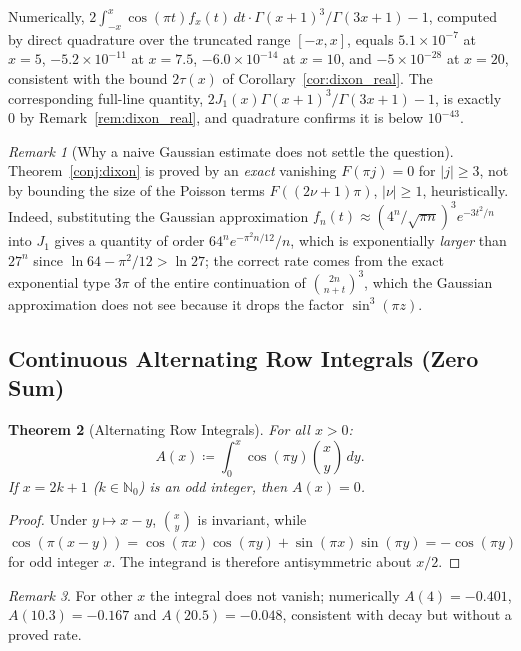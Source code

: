 \documentclass[11pt,a4paper]{article}
\theoremstyle{plain}
\newtheorem{theorem}{Theorem}[section]
\theoremstyle{definition}
\theoremstyle{remark}
\newtheorem{remark}[theorem]{Remark}
\numberwithin{equation}{section}
\begin{document}
Numerically, $2\int_{-x}^{x}\cos(\pi t)f_x(t)\,dt\cdot\Gamma(x+1)^3/\Gamma(3x+1) - 1$, computed by direct quadrature over the truncated range $[-x,x]$, equals $5.1\times10^{-7}$ at $x=5$, $-5.2\times10^{-11}$ at $x=7.5$, $-6.0\times10^{-14}$ at $x=10$, and $-5\times10^{-28}$ at $x=20$, consistent with the bound $2\tau(x)$ of Corollary~\ref{cor:dixon_real}. The corresponding full-line quantity, $2J_1(x)\Gamma(x+1)^3/\Gamma(3x+1) - 1$, is exactly $0$ by Remark~\ref{rem:dixon_real}, and quadrature confirms it is below $10^{-43}$.

\begin{remark}[Why a naive Gaussian estimate does not settle the question]
Theorem~\ref{conj:dixon} is proved by an \emph{exact} vanishing $F(\pi j)=0$ for $|j|\ge3$, not by bounding the size of the Poisson terms $F((2\nu+1)\pi)$, $|\nu|\ge1$, heuristically. Indeed, substituting the Gaussian approximation $f_n(t)\approx(4^n/\sqrt{\pi n})^3e^{-3t^2/n}$ into $J_1$ gives a quantity of order $64^ne^{-\pi^2n/12}/n$, which is exponentially \emph{larger} than $27^n$ since $\ln64-\pi^2/12>\ln27$; the correct rate comes from the exact exponential type $3\pi$ of the entire continuation of $\binom{2n}{n+t}^3$, which the Gaussian approximation does not see because it drops the factor $\sin^3(\pi z)$.
\end{remark}

\subsection{Continuous Alternating Row Integrals (Zero Sum)}

\begin{theorem}[Alternating Row Integrals]
\label{thm:alternating_row_integrals}
For all $x > 0$:
\begin{equation}
A(x) \coloneqq \int_0^x \cos(\pi y) \binom{x}{y}\,dy.
\end{equation}
If $x = 2k+1$ ($k \in \mathbb{N}_0$) is an odd integer, then $A(x) = 0$.
\end{theorem}
\begin{proof}
Under $y \mapsto x - y$, $\binom{x}{y}$ is invariant, while $\cos(\pi(x-y)) = \cos(\pi x)\cos(\pi y) + \sin(\pi x)\sin(\pi y) = -\cos(\pi y)$ for odd integer $x$. The integrand is therefore antisymmetric about $x/2$.
\end{proof}
\begin{remark}
For other $x$ the integral does not vanish; numerically $A(4) = -0.401$, $A(10.3) = -0.167$ and $A(20.5) = -0.048$, consistent with decay but without a proved rate.
\end{remark}
\end{document}

